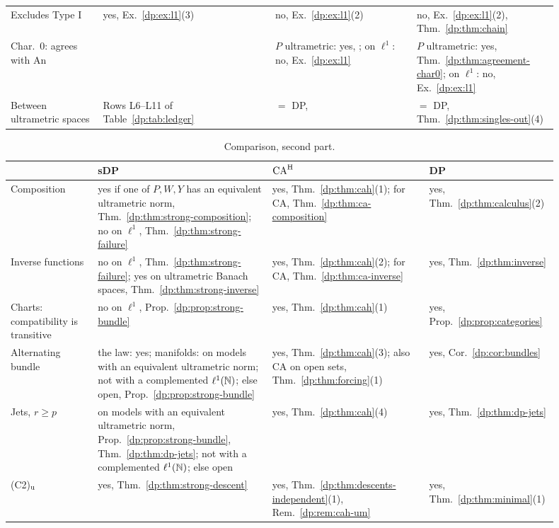 \begin{table}[htbp]
\begin{tabular}{@{}p{0.15\linewidth}p{0.29\linewidth}p{0.23\linewidth}p{0.23\linewidth}@{}}
Excludes Type I & yes, Ex.~\ref{dp:ex:l1}(3) & no, Ex.~\ref{dp:ex:l1}(2) & no, Ex.~\ref{dp:ex:l1}(2), Thm.~\ref{dp:thm:chain}\\
Char.\ $0$: agrees with An & & $P$ ultrametric: yes, \cite[Proposition~14.40(2)]{I}; on $\ell^1$: no, Ex.~\ref{dp:ex:l1} & $P$ ultrametric: yes, Thm.~\ref{dp:thm:agreement-char0}; on $\ell^1$: no, Ex.~\ref{dp:ex:l1}\\
Between ultrametric spaces & Rows L6--L11 of Table~\ref{dp:tab:ledger} & $=$ DP, \cite[Theorem~14.39(1)]{I} & $=$ DP, Thm.~\ref{dp:thm:singles-out}(4)\\
\end{tabular}
\end{table}

\begin{table}[htbp]
\small
\caption{Comparison, second part.}\label{dp:tab:compare-b}
\begin{tabular}{@{}p{0.15\linewidth}p{0.3\linewidth}p{0.27\linewidth}p{0.18\linewidth}@{}}
 & sDP & $\mathrm{CA}^{\rm H}$ & DP\\
\hline
Composition & yes if one of $P,W,Y$ has an equivalent ultrametric norm, Thm.~\ref{dp:thm:strong-composition}; no on $\ell^1$, Thm.~\ref{dp:thm:strong-failure} & yes, Thm.~\ref{dp:thm:cah}(1); for CA, Thm.~\ref{dp:thm:ca-composition} & yes, Thm.~\ref{dp:thm:calculus}(2)\\
Inverse functions & no on $\ell^1$, Thm.~\ref{dp:thm:strong-failure}; yes on ultrametric Banach spaces, Thm.~\ref{dp:thm:strong-inverse} & yes, Thm.~\ref{dp:thm:cah}(2); for CA, Thm.~\ref{dp:thm:ca-inverse} & yes, Thm.~\ref{dp:thm:inverse}\\
Charts: compatibility is transitive & no on $\ell^1$, Prop.~\ref{dp:prop:strong-bundle} & yes, Thm.~\ref{dp:thm:cah}(1) & yes, Prop.~\ref{dp:prop:categories}\\
Alternating bundle & the law: yes; manifolds: on models with an equivalent ultrametric norm; not with a complemented $\ell^1(\mathbb N)$; else open, Prop.~\ref{dp:prop:strong-bundle} & yes, Thm.~\ref{dp:thm:cah}(3); also CA on open sets, Thm.~\ref{dp:thm:forcing}(1) & yes, Cor.~\ref{dp:cor:bundles}\\
Jets, $r\ge p$ & on models with an equivalent ultrametric norm, Prop.~\ref{dp:prop:strong-bundle}, Thm.~\ref{dp:thm:dp-jets}; not with a complemented $\ell^1(\mathbb N)$; else open & yes, Thm.~\ref{dp:thm:cah}(4) & yes, Thm.~\ref{dp:thm:dp-jets}\\
(C2)$_{\rm u}$ & yes, Thm.~\ref{dp:thm:strong-descent} & yes, Thm.~\ref{dp:thm:descents-independent}(1), Rem.~\ref{dp:rem:cah-um} & yes, Thm.~\ref{dp:thm:minimal}(1)\\

\end{tabular}
\end{table}
